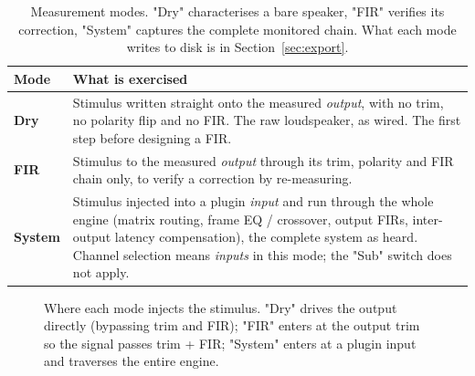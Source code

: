\begin{table}[ht]
\centering
\renewcommand{\arraystretch}{1.3}
\begin{tabularx}{\textwidth}{l X}
\toprule
\textbf{Mode} & \textbf{What is exercised} \\
\midrule
\textbf{Dry} &
  Stimulus written straight onto the measured \emph{output}, with no trim, no
  polarity flip and no FIR. The raw loudspeaker, as wired. The first step before designing a FIR. \\
\textbf{FIR} &
  Stimulus to the measured \emph{output} through its trim, polarity and FIR
  chain only,
  to verify a correction by re-measuring. \\
\textbf{System} &
  Stimulus injected into a plugin \emph{input} and run through the whole engine
  (matrix routing, frame EQ / crossover, output FIRs, inter-output latency
  compensation), the complete system as heard. Channel selection means
  \emph{inputs} in this mode; the "Sub" switch does not apply. \\
\bottomrule
\end{tabularx}
\caption{Measurement modes. "Dry" characterises a bare speaker, "FIR"
verifies its correction, "System" captures the complete monitored chain.
What each mode writes to disk is in Section~\ref{sec:export}.}
\label{tab:measmodes}
\end{table}

\begin{figure}[ht]
\centering
{}
\caption{Where each mode injects the stimulus. "Dry" drives the output directly (bypassing trim and FIR); "FIR" enters at the output trim so the signal passes trim + FIR; "System" enters at a plugin input and traverses the entire engine.}
\label{fig:measmodes}
\end{figure}

